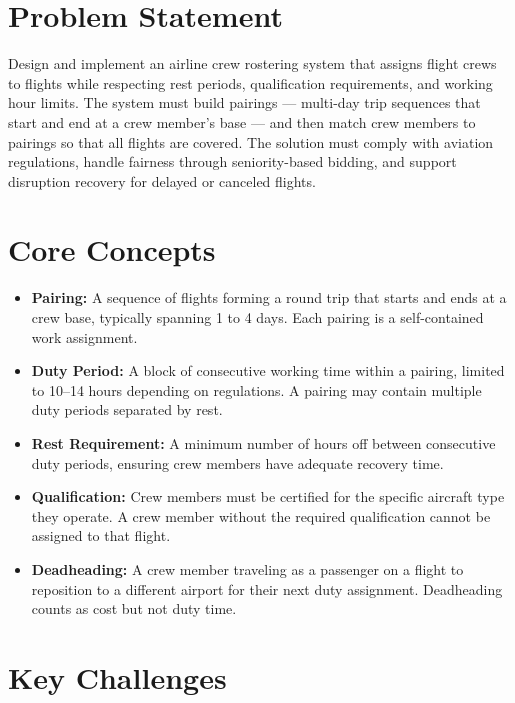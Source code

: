 \section{Problem Statement}

Design and implement an airline crew rostering system that assigns flight crews to flights while respecting rest periods, qualification requirements, and working hour limits. The system must build pairings --- multi-day trip sequences that start and end at a crew member's base --- and then match crew members to pairings so that all flights are covered. The solution must comply with aviation regulations, handle fairness through seniority-based bidding, and support disruption recovery for delayed or canceled flights.

\section{Core Concepts}

\begin{itemize}
  \item \textbf{Pairing:} A sequence of flights forming a round trip that starts and ends at a crew base, typically spanning 1 to 4 days. Each pairing is a self-contained work assignment.
  \item \textbf{Duty Period:} A block of consecutive working time within a pairing, limited to 10--14 hours depending on regulations. A pairing may contain multiple duty periods separated by rest.
  \item \textbf{Rest Requirement:} A minimum number of hours off between consecutive duty periods, ensuring crew members have adequate recovery time.
  \item \textbf{Qualification:} Crew members must be certified for the specific aircraft type they operate. A crew member without the required qualification cannot be assigned to that flight.
  \item \textbf{Deadheading:} A crew member traveling as a passenger on a flight to reposition to a different airport for their next duty assignment. Deadheading counts as cost but not duty time.
\end{itemize}

\section{Key Challenges}

